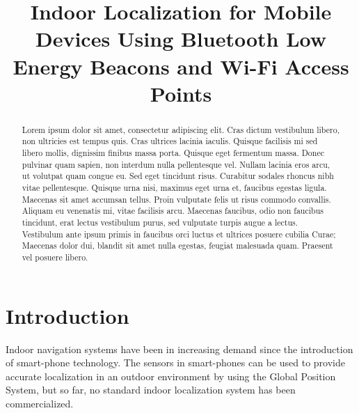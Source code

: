 \documentclass[conference]{IEEEtran}
\begin{document}
\title{Indoor Localization for Mobile Devices Using Bluetooth Low Energy Beacons and Wi-Fi Access Points}

\author{
\and
{}
\and
{}
}

\maketitle

\begin{abstract}
Lorem ipsum dolor sit amet, consectetur adipiscing elit. Cras dictum vestibulum libero, non ultricies est tempus quis. Cras ultrices lacinia iaculis. Quisque facilisis mi sed libero mollis, dignissim finibus massa porta. Quisque eget fermentum massa. Donec pulvinar quam sapien, non interdum nulla pellentesque vel. Nullam lacinia eros arcu, ut volutpat quam congue eu. Sed eget tincidunt risus. Curabitur sodales rhoncus nibh vitae pellentesque. Quisque urna nisi, maximus eget urna et, faucibus egestas ligula. Maecenas sit amet accumsan tellus. Proin vulputate felis ut risus commodo convallis. Aliquam eu venenatis mi, vitae facilisis arcu. Maecenas faucibus, odio non faucibus tincidunt, erat lectus vestibulum purus, sed vulputate turpis augue a lectus. Vestibulum ante ipsum primis in faucibus orci luctus et ultrices posuere cubilia Curae; Maecenas dolor dui, blandit sit amet nulla egestas, feugiat malesuada quam. Praesent vel posuere libero.\end{abstract}


\section{Introduction}
Indoor navigation systems have been in increasing demand since the introduction of smart-phone technology. The sensors in smart-phones can be used to provide accurate localization in an outdoor environment by using the Global Position System, but so far, no standard indoor localization system has been commercialized.
\end{document}
